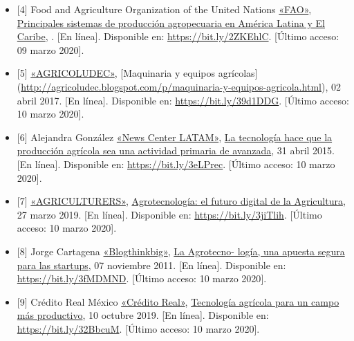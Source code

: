\documentclass[12pt,spanish,Letterpaper,openany]{book}
\begin{document}
\begin{itemize}
\item
  \hypertarget{articulo07_ref04}{}

  {[}4{]} Food and Agriculture Organization of the United Nations \href{http://www.fao.org/}{«FAO»}, \href{http://www.fao.org/3/Y1860s/y1860s09.htm}{Principales sistemas de producción agropecuaria en América Latina y El Caribe}, . {[}En línea{]}. Disponible en: \url{https://bit.ly/2ZKEhlC}. {[}Último acceso: 09 marzo 2020{]}.
\item
  \hypertarget{articulo07_ref05}{}

  {[}5{]} \href{http://agricoludec.blogspot.com/}{«AGRICOLUDEC»}, {[}Maquinaria y equipos agrícolas{]} (\url{http://agricoludec.blogspot.com/p/maquinaria-y-equipos-agricola.html}), 02 abril 2017. {[}En línea{]}. Disponible en: \url{https://bit.ly/39d1DDG}. {[}Último acceso: 10 marzo 2020{]}.
\item
  \hypertarget{articulo07_ref06}{}

  {[}6{]} Alejandra González \href{https://news.microsoft.com/}{«News Center LATAM»}, \href{https://news.microsoft.com/es-xl/la-tecnologia-hace-que-la-produccion-agricola-sea-una-actividad-primaria-de-avanzada}{La tecnología hace que la producción agrícola sea una actividad primaria de avanzada}, 31 abril 2015. {[}En línea{]}. Disponible en: \url{https://bit.ly/3eLPrec}. {[}Último acceso: 10 marzo 2020{]}.
\item
  \hypertarget{articulo07_ref07}{}

  {[}7{]} \href{https://agriculturers.com/}{«AGRICULTURERS»}, \href{https://agriculturers.com/agrotecnologia-el-futuro-digital-de-la-agricultura/}{Agrotecnología: el futuro digital de la Agricultura}, 27 marzo 2019. {[}En línea{]}. Disponible en: \url{https://bit.ly/3jiTlih}. {[}Último acceso: 10 marzo 2020{]}.
\item
  \hypertarget{articulo07_ref08}{}

  {[}8{]} Jorge Cartagena \href{https://blogthinkbig.com/}{«Blogthinkbig»}, \href{https://blogthinkbig.com/la-agrotecnologia-una-apuesta-segura-para-las-startups/}{La Agrotecno-
  logía, una apuesta segura para las startups}, 07 noviembre 2011. {[}En línea{]}. Disponible en: \url{https://bit.ly/3fMDMND}. {[}Último acceso: 10 marzo 2020{]}.
\item
  \hypertarget{articulo07_ref09}{}

  {[}9{]} Crédito Real México \href{https://www.creditoreal.com.mx/}{«Crédito Real»}, \href{https://www.creditoreal.com.mx/blog-credito/tecnologia-agricola-para-un-campo-mas-productivo/}{Tecnología agrícola para un campo más productivo}, 10 octubre 2019. {[}En línea{]}. Disponible en: \url{https://bit.ly/32BbcuM}. {[}Último acceso: 10 marzo 2020{]}.
\end{itemize}
\end{document}
